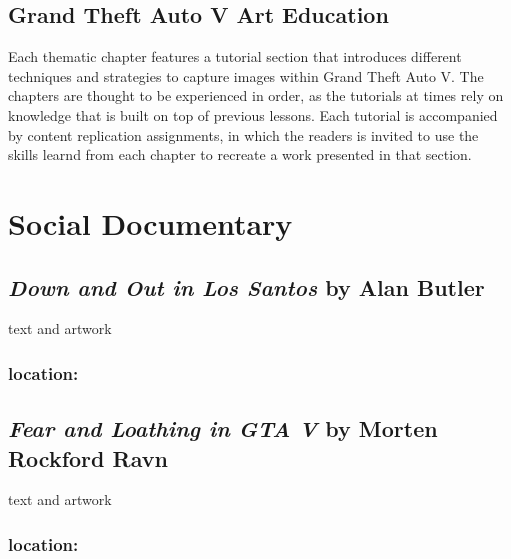 \documentclass[
  openany]{book}
\begin{document}
\hypertarget{grand-theft-auto-v-art-education}{%
\section{Grand Theft Auto V Art Education}\label{grand-theft-auto-v-art-education}}

Each thematic chapter features a tutorial section that introduces different techniques and strategies to capture images within Grand Theft Auto V. The chapters are thought to be experienced in order, as the tutorials at times rely on knowledge that is built on top of previous lessons. Each tutorial is accompanied by content replication assignments, in which the readers is invited to use the skills learnd from each chapter to recreate a work presented in that section.

\hypertarget{social-documentary}{%
\chapter{Social Documentary}\label{social-documentary}}

\hypertarget{down-and-out-in-los-santos-by-alan-butler}{%
\section{\texorpdfstring{\emph{Down and Out in Los Santos} by Alan Butler}{Down and Out in Los Santos by Alan Butler}}\label{down-and-out-in-los-santos-by-alan-butler}}

text and artwork

\hypertarget{location}{%
\subsection{location:}\label{location}}

\hypertarget{fear-and-loathing-in-gta-v-by-morten-rockford-ravn}{%
\section{\texorpdfstring{\emph{Fear and Loathing in GTA V} by Morten Rockford Ravn}{Fear and Loathing in GTA V by Morten Rockford Ravn}}\label{fear-and-loathing-in-gta-v-by-morten-rockford-ravn}}

text and artwork

\hypertarget{location-1}{%
\subsection{location:}\label{location-1}}
\end{document}
